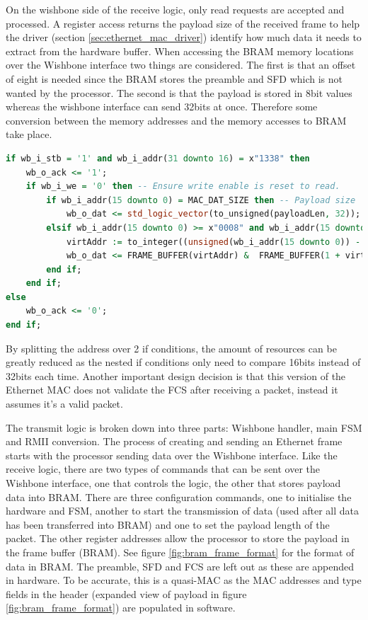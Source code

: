 On the wishbone side of the receive logic, only read requests are accepted and processed. A register access returns the payload size of the received frame to help the driver (section \ref{sec:ethernet_mac_driver}) identify how much data it needs to extract from the hardware buffer. When accessing the BRAM memory locations over the Wishbone interface two things are considered. The first is that an offset of eight is needed since the BRAM stores the preamble and SFD which is not wanted by the processor. The second is that the payload is stored in 8bit values whereas the wishbone interface can send 32bits at once. Therefore some conversion between the memory addresses and the memory accesses to BRAM take place. 

\begin{lstlisting}[language=VHDL, caption=Wishbone access logic for Ethernet receive]
if wb_i_stb = '1' and wb_i_addr(31 downto 16) = x"1338" then 
    wb_o_ack <= '1';
    if wb_i_we = '0' then -- Ensure write enable is reset to read.
        if wb_i_addr(15 downto 0) = MAC_DAT_SIZE then -- Payload size
            wb_o_dat <= std_logic_vector(to_unsigned(payloadLen, 32));
        elsif wb_i_addr(15 downto 0) >= x"0008" and wb_i_addr(15 downto 0) <= x"05F8" then -- BRAM access
            virtAddr := to_integer((unsigned(wb_i_addr(15 downto 0)) - 8));
            wb_o_dat <= FRAME_BUFFER(virtAddr) &  FRAME_BUFFER(1 + virtAddr) & FRAME_BUFFER(2 + virtAddr) & FRAME_BUFFER(3 + virtAddr);
        end if;
    end if;
else
    wb_o_ack <= '0';
end if;
\end{lstlisting}

By splitting the address over 2 if conditions, the amount of resources can be greatly reduced as the nested if conditions only need to compare 16bits instead of 32bits each time. Another important design decision is that this version of the Ethernet MAC does not validate the FCS after receiving a packet, instead it assumes it's a valid packet. 


The transmit logic is broken down into three parts: Wishbone handler, main FSM and RMII conversion. The process of creating and sending an Ethernet frame starts with the processor sending data over the Wishbone interface. Like the receive logic, there are two types of commands that can be sent over the Wishbone interface, one that controls the logic, the other that stores payload data into BRAM. There are three configuration commands, one to initialise the hardware and FSM, another to start the transmission of data (used after all data has been transferred into BRAM) and one to set the payload length of the packet. The other register addresses allow the processor to store the payload in the frame buffer (BRAM). See figure \ref{fig:bram_frame_format} for the format of data in BRAM. The preamble, SFD and FCS are left out as these are appended in hardware. To be accurate, this is a quasi-MAC as the MAC addresses and type fields in the header (expanded view of payload in figure \ref{fig:bram_frame_format}) are populated in software. 

